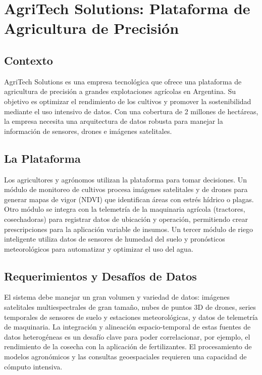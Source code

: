 \documentclass[12pt]{article}
\begin{document}
\newpage

\section{AgriTech Solutions: Plataforma de Agricultura de Precisión}

\subsection{Contexto}
AgriTech Solutions es una empresa tecnológica que ofrece una plataforma de agricultura de precisión a grandes explotaciones agrícolas en Argentina. Su objetivo es optimizar el rendimiento de los cultivos y promover la sostenibilidad mediante el uso intensivo de datos. Con una cobertura de 2 millones de hectáreas, la empresa necesita una arquitectura de datos robusta para manejar la información de sensores, drones e imágenes satelitales.

\subsection{La Plataforma}
Los agricultores y agrónomos utilizan la plataforma para tomar decisiones. Un módulo de monitoreo de cultivos procesa imágenes satelitales y de drones para generar mapas de vigor (NDVI) que identifican áreas con estrés hídrico o plagas. Otro módulo se integra con la telemetría de la maquinaria agrícola (tractores, cosechadoras) para registrar datos de ubicación y operación, permitiendo crear prescripciones para la aplicación variable de insumos. Un tercer módulo de riego inteligente utiliza datos de sensores de humedad del suelo y pronósticos meteorológicos para automatizar y optimizar el uso del agua.

\subsection{Requerimientos y Desafíos de Datos}
El sistema debe manejar un gran volumen y variedad de datos: imágenes satelitales multiespectrales de gran tamaño, nubes de puntos 3D de drones, series temporales de sensores de suelo y estaciones meteorológicas, y datos de telemetría de maquinaria. La integración y alineación espacio-temporal de estas fuentes de datos heterogéneas es un desafío clave para poder correlacionar, por ejemplo, el rendimiento de la cosecha con la aplicación de fertilizantes. El procesamiento de modelos agronómicos y las consultas geoespaciales requieren una capacidad de cómputo intensiva.
\end{document}
